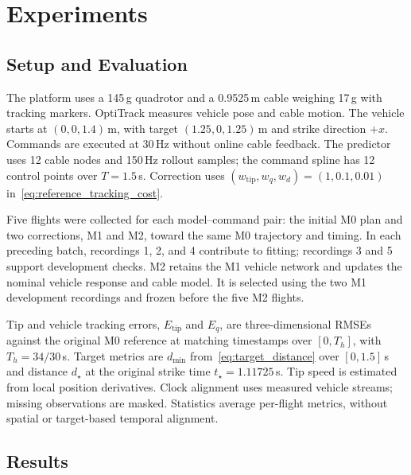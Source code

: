 \section{Experiments}
\label{sec:experiments}

\subsection{Setup and Evaluation}
\label{subsec:experimental_setup}
\label{subsec:experimental_metrics}

The platform uses a 145\,g quadrotor and a 0.9525\,m cable
weighing 17\,g with tracking markers. OptiTrack measures vehicle
pose and cable motion. The vehicle starts at $(0,0,1.4)$\,m,
with target $(1.25,0,1.25)$\,m and strike direction $+x$.
Commands are executed at 30\,Hz without online cable feedback.
The predictor uses 12 cable nodes and 150\,Hz rollout samples;
the command spline has 12 control points over $T=1.5$\,s.
Correction uses $(w_{\mathrm{tip}},w_q,w_d)=(1,0.1,0.01)$
in~\eqref{eq:reference_tracking_cost}.

Five flights were collected for each model--command pair:
the initial M0 plan and two corrections, M1 and M2, toward
the same M0 trajectory and timing. In each preceding batch,
recordings 1, 2, and 4 contribute to fitting; recordings 3
and 5 support development checks. M2 retains the M1 vehicle
network and updates the nominal vehicle response and cable
model. It is selected using the two M1 development recordings
and frozen before the five M2 flights.

Tip and vehicle tracking errors, $E_{\mathrm{tip}}$ and $E_q$,
are three-dimensional RMSEs against the original M0 reference
at matching timestamps over $[0,T_h]$, with $T_h=34/30$\,s.
Target metrics are $d_{\min}$ from~\eqref{eq:target_distance}
over $[0,1.5]$\,s and distance $d_\star$ at the original
strike time $t_\star=1.11725$\,s. Tip speed is estimated from
local position derivatives. Clock alignment uses measured
vehicle streams; missing observations are masked. Statistics
average per-flight metrics, without spatial or target-based
temporal alignment.

\subsection{Results}
\label{subsec:physical_results}
\label{subsec:prediction_results}

